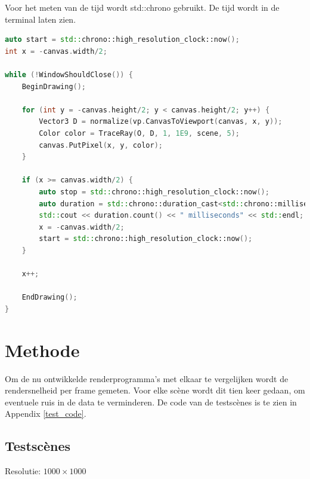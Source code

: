 \documentclass[12pt, a4paper]{article}
\begin{document}
Voor het meten van de tijd wordt std::chrono gebruikt. De tijd wordt in de terminal laten zien.
\begin{lstlisting}[language=c++]
auto start = std::chrono::high_resolution_clock::now();
int x = -canvas.width/2;

while (!WindowShouldClose()) {
	BeginDrawing();

	for (int y = -canvas.height/2; y < canvas.height/2; y++) {
		Vector3 D = normalize(vp.CanvasToViewport(canvas, x, y));
		Color color = TraceRay(O, D, 1, 1E9, scene, 5);
		canvas.PutPixel(x, y, color);
	}
	
	if (x >= canvas.width/2) {
		auto stop = std::chrono::high_resolution_clock::now();
		auto duration = std::chrono::duration_cast<std::chrono::milliseconds>(stop - start);
		std::cout << duration.count() << " milliseconds" << std::endl;
		x = -canvas.width/2;
		start = std::chrono::high_resolution_clock::now();
	}
	
	x++;
	
	EndDrawing();
}
\end{lstlisting}

\clearpage
\section{Methode}
Om de nu ontwikkelde renderprogramma's met elkaar te vergelijken wordt de rendersnelheid per frame gemeten. Voor elke scène wordt dit tien keer gedaan, om eventuele ruis in de data te verminderen. De code van de testscènes is te zien in Appendix \ref{test_code}.
\subsection{Testscènes}
Resolutie: $1000\times 1000$
\end{document}
